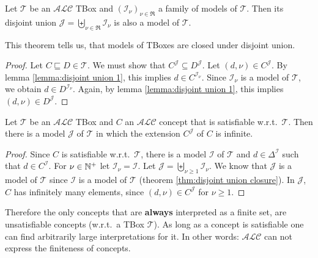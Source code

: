 \begin{theorem}\label{thm:disjoint union closure}
	Let $\mathcal{T}$ be an $\mathcal{ALC}$ TBox and $(\mathcal{I}_\nu)_{\nu \in \mathfrak{R}}$ a family of models of $\mathcal{T}$.
	Then its disjoint union $\mathcal{J} = \biguplus_{\nu \in \mathfrak{R}} \mathcal{I}_\nu$ is also a model of $\mathcal{T}$.
\end{theorem}
This theorem tells us, that models of TBoxes are closed under disjoint union.
\begin{proof}
	Let $C \sqsubseteq D \in \mathcal{T}$.
	We must show that $C^{\mathcal{J}} \subseteq D^{\mathcal{J}}$.
	Let $\left( d,\nu \right) \in C^{\mathcal{J}}$.
	By lemma \ref{lemma:disjoint union 1}, this implies $d \in C^{\mathcal{I}_\nu}$.
	Since $\mathcal{I}_\nu$ is a model of $\mathcal{T}$, we obtain $d \in D^{\mathcal{I}_\nu}$.
	Again, by lemma \ref{lemma:disjoint union 1}, this implies $(d,\nu) \in D^{\mathcal{J}}$.
\end{proof}

\begin{corollary}
 	Let $\mathcal{T}$ be an $\mathcal{ALC}$ TBox and $C$ an $\mathcal{ALC}$ concept that is satisfiable w.r.t.\ $\mathcal{T}$.
	Then there is a model $\mathcal{J}$ of $\mathcal{T}$ in which the extension $C^{\mathcal{J}}$ of $C$ is infinite.
\end{corollary}
\begin{proof}
	Since $C$ is satisfiable w.r.t.\ $\mathcal{T}$, there is a model $\mathcal{I}$ of $\mathcal{T}$ and $d \in \Delta^{\mathcal{I}}$ such that $d \in C^{\mathcal{I}}$.
	For $\nu \in \mathbb{N}^{+}$ let $\mathcal{I}_\nu = \mathcal{I}$.
	Let $\mathcal{J} = \biguplus_{\nu \geq 1} \mathcal{I}_\nu$.
	We know that $\mathcal{J}$ is a model of $\mathcal{T}$ since $\mathcal{I}$ is a model of $\mathcal{T}$ (theorem \ref{thm:disjoint union closure}).
	In $\mathcal{J}$, $C$ has infinitely many elements, since $(d,\nu) \in C^{\mathcal{J}}$ for $\nu \geq 1$.
\end{proof}
Therefore the only concepts that are \textbf{always} interpreted as a finite set,
are unsatisfiable concepts (w.r.t.\ a TBox $\mathcal{T}$).
As long as a concept is satisfiable one can find arbitrarily large interpretations for it.
In other words: $\mathcal{ALC}$ can not express the finiteness of concepts.

